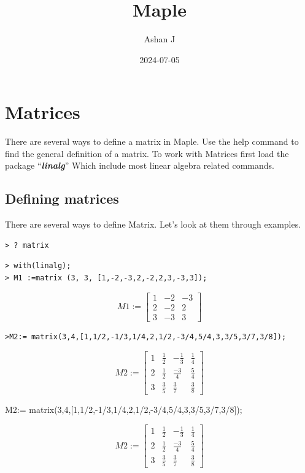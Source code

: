 \documentclass[
]{book}
\title{Maple}
\author{Ashan J}
\date{2024-07-05}
\theoremstyle{definition}
\theoremstyle{definition}
\theoremstyle{definition}
\theoremstyle{definition}
\theoremstyle{remark}
\begin{document}
\maketitle

{
\setcounter{tocdepth}{1}
\tableofcontents
}
\chapter{Matrices}\label{matrices}

There are several ways to define a matrix in Maple.
Use the help command to find the general definition of a matrix.
To work with Matrices first load the package ``\textbf{\emph{linalg}}'' Which include most linear algebra related commands.

\section{Defining matrices}\label{defining-matrices}

There are several ways to define Matrix. Let's look at them through examples.

\begin{verbatim}
> ? matrix
\end{verbatim}

\begin{verbatim}
> with(linalg);
> M1 :=matrix (3, 3, [1,-2,-3,2,-2,2,3,-3,3]);
\end{verbatim}

\[M1:=
\begin{bmatrix}
1 &-2& -3\\
2 &-2& 2\\
3 &-3& 3
\end{bmatrix}
\]

\begin{verbatim}
>M2:= matrix(3,4,[1,1/2,-1/3,1/4,2,1/2,-3/4,5/4,3,3/5,3/7,3/8]);
\end{verbatim}

\[
M2:=
\begin{bmatrix}
1 & \frac{1}{2} & -\frac{  1}{3} & \frac{1}{4}\\
2 & \frac{1}{2} & \frac{ -3}{4} & \frac{5}{4}\\
3 & \frac{3}{5} & \frac{  3}{7} & \frac{3}{8}
\end{bmatrix}
\]

{
M2:= matrix(3,4,{[}1,1/2,-1/3,1/4,2,1/2,-3/4,5/4,3,3/5,3/7,3/8{]});
}

{
\[
M2:=
\begin{bmatrix}
1 & \frac{1}{2} & -\frac{  1}{3} & \frac{1}{4}\\
2 & \frac{1}{2} & \frac{ -3}{4} & \frac{5}{4}\\
3 & \frac{3}{5} & \frac{  3}{7} & \frac{3}{8}
\end{bmatrix}
\]
}
\end{document}
